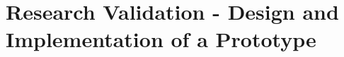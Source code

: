 \chapter{Research Validation - Design and Implementation of a Prototype}
\label{chap:prototype}
\minitoc \mtcskip \noindent 








